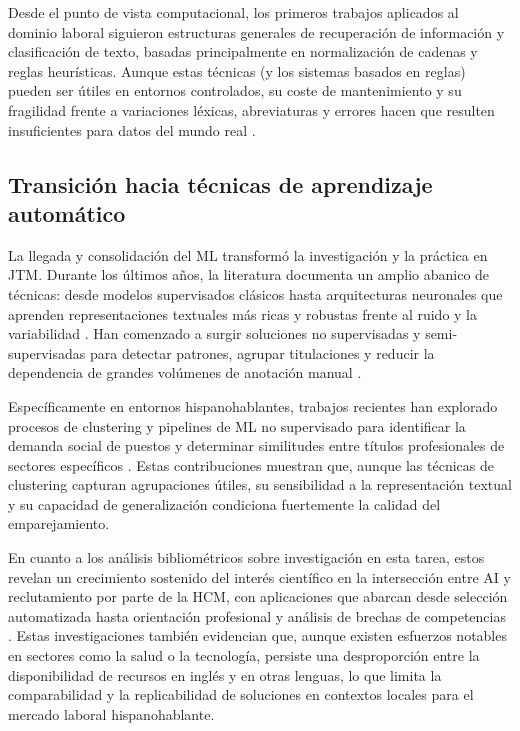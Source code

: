Desde el punto de vista computacional, los primeros trabajos aplicados al dominio laboral siguieron estructuras generales de recuperación de información y clasificación de texto, basadas principalmente en normalización de cadenas y reglas heurísticas. Aunque estas técnicas (y los sistemas basados en reglas) pueden ser útiles en entornos controlados, su coste de mantenimiento y su fragilidad frente a variaciones léxicas, abreviaturas y errores hacen que resulten insuficientes para datos del mundo real \cite{jirjees2025machine}.

\subsection{Transición hacia técnicas de aprendizaje automático}

\noindent La llegada y consolidación del \gls{ML} transformó la investigación y la práctica en \gls{JTM}. Durante los últimos años, la literatura documenta un amplio abanico de técnicas: desde modelos supervisados clásicos hasta arquitecturas neuronales que aprenden representaciones textuales más ricas y robustas frente al ruido y la variabilidad \cite{jirjees2025machine}. Han comenzado a surgir soluciones no supervisadas y semi-supervisadas para detectar patrones, agrupar titulaciones y reducir la dependencia de grandes volúmenes de anotación manual \cite{mamani2022machine}.

Específicamente en entornos hispanohablantes, trabajos recientes han explorado procesos de clustering y pipelines de \gls{ML} no supervisado para identificar la demanda social de puestos y determinar similitudes entre títulos profesionales de sectores específicos \cite{mamani2022proceso}. Estas contribuciones muestran que, aunque las técnicas de clustering capturan agrupaciones útiles, su sensibilidad a la representación textual y su capacidad de generalización condiciona fuertemente la calidad del emparejamiento.

En cuanto a los análisis bibliométricos sobre investigación en esta tarea, estos revelan un crecimiento sostenido del interés científico en la intersección entre \gls{AI} y reclutamiento por parte de la \gls{HCM}, con aplicaciones que abarcan desde selección automatizada hasta orientación profesional y análisis de brechas de competencias \cite{rojas2022bibliometric}. Estas investigaciones también evidencian que, aunque existen esfuerzos notables en sectores como la salud o la tecnología, persiste una desproporción entre la disponibilidad de recursos en inglés y en otras lenguas, lo que limita la comparabilidad y la replicabilidad de soluciones en contextos locales para el mercado laboral hispanohablante.

